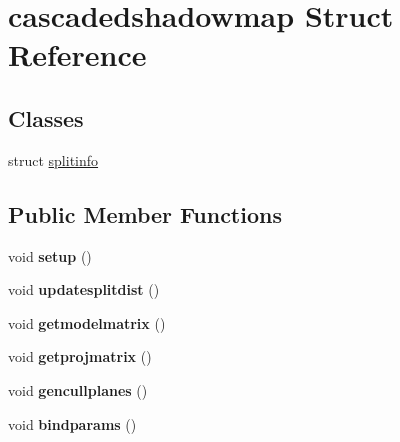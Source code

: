 \hypertarget{structcascadedshadowmap}{}\section{cascadedshadowmap Struct Reference}
\label{structcascadedshadowmap}
\subsection*{Classes}
\begin{DoxyCompactItemize}
\item 
struct \hyperlink{structcascadedshadowmap_1_1splitinfo}{splitinfo}
\end{DoxyCompactItemize}
\subsection*{Public Member Functions}
\begin{DoxyCompactItemize}
\item 
\mbox{\label{structcascadedshadowmap_ae39b771386f3b15e9bc01e93e5b91a3b}} 
void {\bfseries setup} ()
\item 
\mbox{\label{structcascadedshadowmap_a82372d16daef1a83f48026212ea06fa5}} 
void {\bfseries updatesplitdist} ()
\item 
\mbox{\label{structcascadedshadowmap_a541310c2d80110f7fbf2f692cc0ff20f}} 
void {\bfseries getmodelmatrix} ()
\item 
\mbox{\label{structcascadedshadowmap_ad2462536932a778b4698a669e6fdebab}} 
void {\bfseries getprojmatrix} ()
\item 
\mbox{\label{structcascadedshadowmap_a0a672f1e983f662ee304d3011865ecd5}} 
void {\bfseries gencullplanes} ()
\item 
\mbox{\label{structcascadedshadowmap_aacd502773ca47b16c8da5418c25d9631}} 
void {\bfseries bindparams} ()
\end{DoxyCompactItemize}
